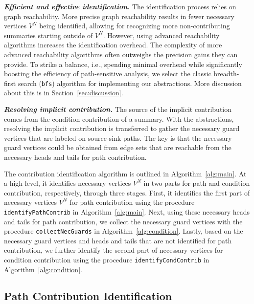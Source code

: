 \textit{\textbf{Efficient and effective identification.}}
    The identification process relies on graph reachability. 
    More precise graph reachability results in fewer necessary vertices $V^{N}$ being identified, allowing for recognizing more non-contributing summaries starting outside of $V^{N}$. 
    However, using advanced reachability algorithms increases the identification overhead. 
    The complexity of more advanced reachability algorithms often outweighs the precision gains they can provide. 
    To strike a balance, i.e., spending minimal overhead while significantly boosting the efficiency of path-sensitive analysis, we select the classic breadth-first search (\texttt{bfs}) algorithm for implementing our abstractions. More discussion about this is in Section~\ref{sec:discussion}.


\textit{\textbf{Resolving implicit contribution.}}
    The source of the implicit contribution comes from the condition contribution of a summary.
    With the abstractions, resolving the implicit contribution is transferred to gather the necessary guard vertices that are labeled on source-sink paths.
    The key is that the necessary guard vertices could be obtained from edge sets that are reachable from the necessary heads and tails for path contribution.


The contribution identification algorithm is outlined in Algorithm~\ref{alg:main}.
At a high level, it identifies necessary vertices $V^{N}$ in two parts for path and condition contribution, respectively, through three stages.
First, it identifies the first part of necessary vertices $V^{N}$ for path contribution using the procedure \texttt{identifyPathContrib} in Algorithm~\ref{alg:main}.
Next, using these necessary heads and tails for path contribution, we collect the necessary guard vertices with the procedure \texttt{collectNecGuards} in Algorithm~\ref{alg:condition}.
Lastly, based on the necessary guard vertices and heads and tails that are not identified for path contribution, we further identify the second part of necessary vertices for condition contribution using the procedure \texttt{identifyCondContrib} in Algorithm~\ref{alg:condition}.


\subsection{Path Contribution Identification}


